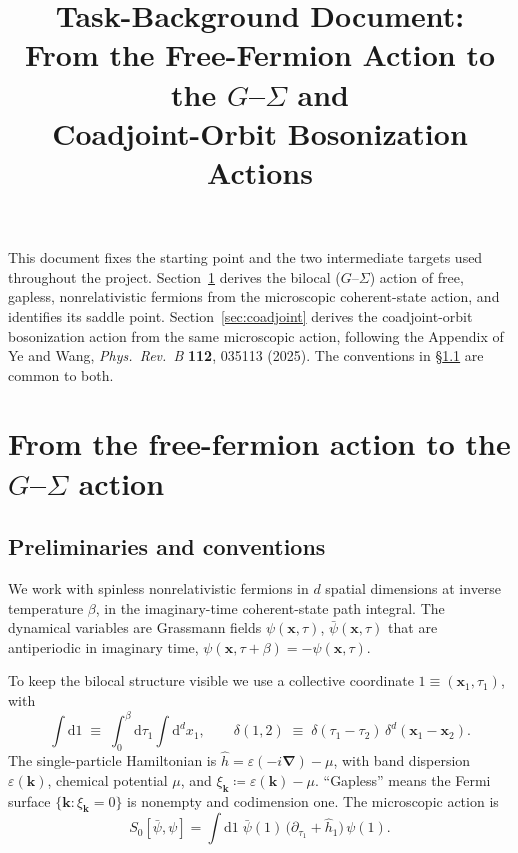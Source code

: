 \documentclass[11pt]{article}
\title{Task-Background Document:\\ From the Free-Fermion Action to the $G$--$\Sigma$ and\\ Coadjoint-Orbit Bosonization Actions}
\author{}
\date{}
\theoremstyle{remark}
\begin{document}
\maketitle

\noindent
This document fixes the starting point and the two intermediate targets used
throughout the project. Section~\ref{sec:gsigma} derives the bilocal
($G$--$\Sigma$) action of free, gapless, nonrelativistic fermions from the
microscopic coherent-state action, and identifies its saddle point. Section~\ref{sec:coadjoint}
derives the coadjoint-orbit bosonization action from the same microscopic action,
following the Appendix of Ye and Wang, \emph{Phys.\ Rev.\ B} \textbf{112}, 035113
(2025). The conventions in \S\ref{sec:prelim} are common to both.

\section{From the free-fermion action to the \texorpdfstring{$G$--$\Sigma$}{G-Sigma} action}
\label{sec:gsigma}

\subsection{Preliminaries and conventions}
\label{sec:prelim}

We work with spinless nonrelativistic fermions in $d$ spatial dimensions at
inverse temperature $\beta$, in the imaginary-time coherent-state path integral.
The dynamical variables are Grassmann fields $\psi(\bm{x},\tau)$, $\bar{\psi}(\bm{x},\tau)$
that are antiperiodic in imaginary time, $\psi(\bm{x},\tau+\beta)=-\psi(\bm{x},\tau)$.

To keep the bilocal structure visible we use a collective coordinate
$1 \equiv (\bm{x}_1,\tau_1)$, with
\begin{equation}
\int \mathrm{d} 1 \;\equiv\; \int_0^\beta \mathrm{d}\tau_1 \int \mathrm{d}^d x_1 ,
\qquad
\delta(1,2) \;\equiv\; \delta(\tau_1-\tau_2)\,\delta^d(\bm{x}_1-\bm{x}_2).
\end{equation}
The single-particle Hamiltonian is $\hat h = \varepsilon(-i\bm{\nabla})-\mu$, with
band dispersion $\varepsilon(\bm{k})$, chemical potential $\mu$, and
$\xi_{\bm{k}}\coloneqq \varepsilon(\bm{k})-\mu$. ``Gapless'' means the Fermi surface
$\{\bm{k}:\xi_{\bm{k}}=0\}$ is nonempty and codimension one. The microscopic action is
\begin{equation}
\label{eq:S0}
S_0[\bar{\psi},\psi]
= \int \mathrm{d} 1\;\bar{\psi}(1)\,\big(\partial_{\tau_1}+\hat h_1\big)\,\psi(1).
\end{equation}
\end{document}
